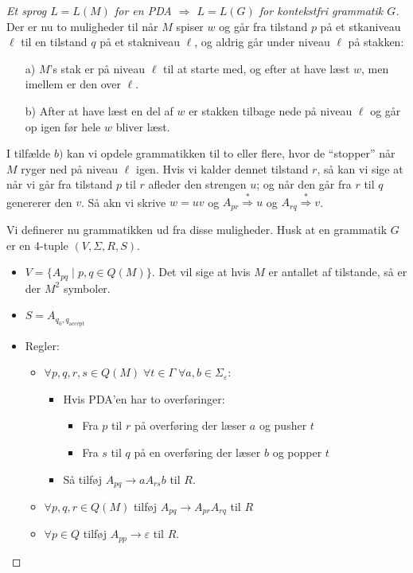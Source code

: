 \begin{proof}[Et sprog $L = L(M)$ for en PDA $\Rightarrow$ $L = L(G)$ for kontekstfri grammatik $G$]
	Der er nu to muligheder til når $M$ spiser $w$ og går fra tilstand $p$ på et stkaniveau $\ell$ til en tilstand $q$ på et stakniveau \(\ell\), og aldrig går under niveau \(\ell\) på stakken:
	\begin{enumerate}
		\item[a)] $M$'s stak er på niveau \(\ell\) til at starte med, og efter at have læst $w$, men imellem er den over \(\ell\).
		\item[b)] After at have læst en del af $w$ er stakken tilbage nede på niveau \(\ell\) og går op igen før hele $w$ bliver læst.
	\end{enumerate}

	I tilfælde $b)$ kan vi opdele grammatikken til to eller flere, hvor de ``stopper'' når $M$ ryger ned på niveau \(\ell\) igen. Hvis vi kalder dennet tilstand $r$, så kan vi sige at når vi går fra tilstand $p$ til $r$ afleder den strengen $u$; og når den går fra $r$ til $q$ genererer den $v$. Så akn vi skrive $w = uv$ og $A_{pr} \stackrel{*}{\Rightarrow} u$ og $A_{rq} \stackrel{*}{\Rightarrow} v$.

	Vi definerer nu grammatikken ud fra disse muligheder. Husk at en grammatik $G$ er en 4-tuple $(V, \Sigma, R, S)$.
	\begin{itemize}
		\item $V = \{A_{pq} \mid p, q \in Q(M)\}$. Det vil sige at hvis $M$ er antallet af tilstande, så er der $M^{2}$ symboler.
		\item $S = A_{q_{0}, q_{\text{accept}}}$
		\item Regler:
		      \begin{itemize}
			      \item $\forall p,q,r,s \in Q(M) \; \forall t \in \Gamma \; \forall a,b \in \Sigma_{\varepsilon}$:
			            \begin{itemize}

				            \item Hvis PDA'en har to overføringer:
				                  \begin{itemize}
					                  \item Fra $p$ til $r$ på overføring der læser $a$ og pusher $t$
					                  \item Fra $s$ til $q$ på en overføring der læser $b$ og popper $t$
				                  \end{itemize}
				            \item Så tilføj $A_{pq} \rightarrow aA_{rs}b$ til $R$.
			            \end{itemize}
			      \item \(\forall p, q, r \in Q(M)\) tilføj $A_{pq} \rightarrow A_{pr}A_{rq}$ til $R$
			      \item \(\forall p \in Q\) tilføj $A_{pp} \rightarrow \varepsilon$ til $R$.
		      \end{itemize}
	\end{itemize}


\end{proof}
